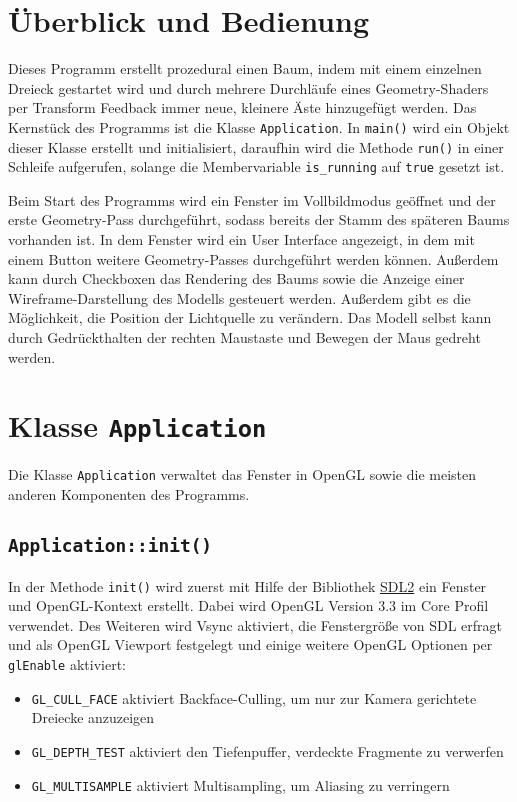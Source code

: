 \chapter{Überblick und Bedienung}
Dieses Programm erstellt prozedural einen Baum, indem mit einem einzelnen Dreieck gestartet wird und durch mehrere Durchläufe eines Geometry-Shaders per Transform Feedback immer neue, kleinere Äste hinzugefügt werden. Das Kernstück des Programms ist die Klasse \lstinline{Application}. In \lstinline{main()} wird ein Objekt dieser Klasse erstellt und initialisiert, daraufhin wird die Methode \lstinline{run()} in einer Schleife aufgerufen, solange die Membervariable \lstinline{is_running} auf \lstinline{true} gesetzt ist. 

Beim Start des Programms wird ein Fenster im Vollbildmodus geöffnet und der erste Geometry-Pass durchgeführt, sodass bereits der Stamm des späteren Baums vorhanden ist. In dem Fenster wird ein User Interface angezeigt, in dem mit einem Button weitere Geometry-Passes durchgeführt werden können. Außerdem kann durch Checkboxen das Rendering des Baums sowie die Anzeige einer Wireframe-Darstellung des Modells gesteuert werden. Außerdem gibt es die Möglichkeit, die Position der Lichtquelle zu verändern. Das Modell selbst kann durch Gedrückthalten der rechten Maustaste und Bewegen der Maus gedreht werden.


\chapter{Klasse \lstinline{Application}}
Die Klasse \lstinline{Application} verwaltet das Fenster in OpenGL sowie die meisten anderen Komponenten des Programms. 

\section{\lstinline{Application::init()}}
In der Methode \lstinline{init()} wird zuerst mit Hilfe der Bibliothek \href{https://www.libsdl.org/}{SDL2} ein Fenster und OpenGL-Kontext erstellt. Dabei wird OpenGL Version 3.3 im Core Profil verwendet. Des Weiteren wird Vsync aktiviert, die Fenstergröße von SDL erfragt und als OpenGL Viewport festgelegt und einige weitere OpenGL Optionen per \lstinline{glEnable} aktiviert:

\begin{itemize}
    \item \lstinline{GL_CULL_FACE} aktiviert Backface-Culling, um nur zur Kamera gerichtete Dreiecke anzuzeigen
    \item \lstinline{GL_DEPTH_TEST} aktiviert den Tiefenpuffer, verdeckte Fragmente zu verwerfen
    \item \lstinline{GL_MULTISAMPLE} aktiviert Multisampling, um Aliasing zu verringern
\end{itemize}

